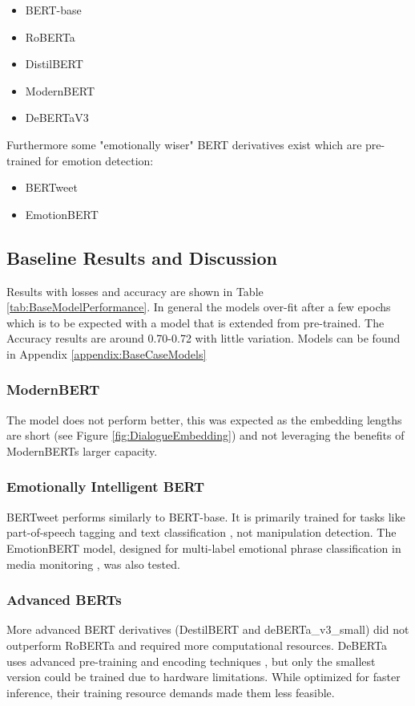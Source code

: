 \documentclass[
	letterpaper, %
	12pt, %
	unnumberedsections, %
	twoside, %
]{LTJournalArticle}
\begin{document}
\begin{itemize}
	\item BERT-base \cite{BERT-base}
	\item RoBERTa \cite{RoBERTa}
	\item DistilBERT \cite{DistilBERT}
	\item ModernBERT \cite{ModernBERT}
	\item DeBERTaV3 \cite{DeBERTaV3}
\end{itemize}
Furthermore some "emotionally wiser" BERT derivatives exist which are pre-trained for emotion detection:
\begin{itemize}
	\item BERTweet \cite{BERTweet}
	\item EmotionBERT \cite{EmotionBERT}
\end{itemize}

\subsection{Baseline Results and Discussion}\label{sec:BaselineResults}
Results with losses and accuracy are shown in Table \ref{tab:BaseModelPerformance}. In general the models over-fit after a few epochs which is to be expected with a model that is extended from pre-trained. The Accuracy results are around 0.70-0.72 with little variation. Models can be found in Appendix \ref{appendix:BaseCaseModels}

\subsubsection{ModernBERT} The model does not perform better, this was expected as the embedding lengths are short (see Figure \ref{fig:DialogueEmbedding}) and not leveraging the benefits of ModernBERTs larger capacity.

\subsubsection{Emotionally Intelligent BERT}
BERTweet performs similarly to BERT-base. It is primarily trained for tasks like part-of-speech tagging and text classification \cite{BERTweet}, not manipulation detection. The EmotionBERT model, designed for multi-label emotional phrase classification in media monitoring \cite{EmotionBERT}, was also tested.

\subsubsection{Advanced BERTs}
More advanced BERT derivatives (DestilBERT and deBERTa\_v3\_small) did not outperform RoBERTa and required more computational resources. DeBERTa uses advanced pre-training and encoding techniques \cite{DeBERTaV3}, but only the smallest version could be trained due to hardware limitations. While optimized for faster inference, their training resource demands made them less feasible.
\end{document}

